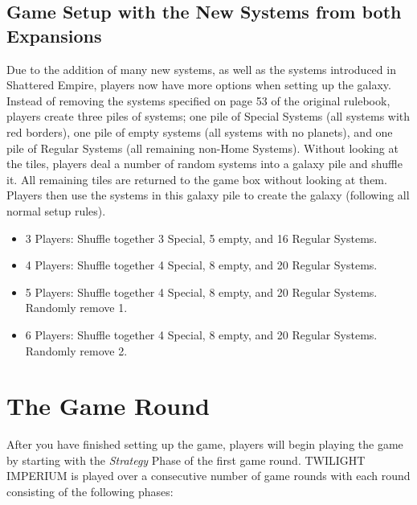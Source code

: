 \documentclass[11pt,fleqn]{book} %
\begin{document}
\begin{STbox}
\subsection{Game Setup with the New Systems from both Expansions}

Due to the addition of many new systems, as well as the systems introduced in Shattered Empire, players now have more options when setting up the galaxy. Instead of removing the systems specified on page 53 of the original rulebook, players create three piles of systems; one pile of Special Systems (all systems with red borders), one pile of empty systems (all systems with no planets), and one pile of Regular Systems (all remaining non-Home Systems). Without looking at the tiles, players deal a number of random systems into a galaxy pile and shuffle it. All remaining tiles are returned to the game box without looking at them. Players then use the systems in this galaxy pile to create the galaxy (following all normal setup rules).

\begin{itemize}
\item 3 Players: Shuffle together 3 Special, 5 empty, and 16 Regular Systems.
\item 4 Players: Shuffle together 4 Special, 8 empty, and 20 Regular Systems.
\item 5 Players: Shuffle together 4 Special, 8 empty, and 20 Regular Systems. Randomly remove 1.
\item 6 Players: Shuffle together 4 Special, 8 empty, and 20 Regular Systems. Randomly remove 2.
\end{itemize}
\end{STbox}

\section{The Game Round}
After you have finished setting up the game, players will begin playing the game by starting with the
\emph{Strategy} Phase of the first game round. TWILIGHT IMPERIUM is played over a consecutive number of game rounds with each round consisting of the following phases:
\end{document}
